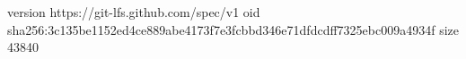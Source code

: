 version https://git-lfs.github.com/spec/v1
oid sha256:3c135be1152ed4ce889abe4173f7e3fcbbd346e71dfdcdff7325ebc009a4934f
size 43840
